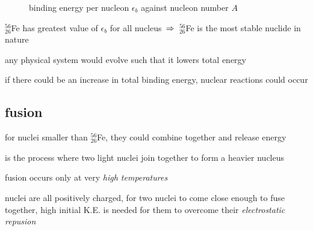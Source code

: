 \begin{figure*}[ht]
\centering
{}
  \label{binding-energy}
\caption{binding energy per nucleon $\epsilon_b$ against nucleon number $A$}
\end{figure*}


\cmt $^{56}_{26}$Fe has greatest value of $\epsilon_b$ for all nucleus $\, \Rightarrow \,$ $^{56}_{26}$Fe is the most stable nuclide in nature

\cmt any physical system would evolve such that it lowers total energy

if there could be an increase in total binding energy, nuclear reactions could occur


\subsection{fusion}

for nuclei smaller than $^{56}_{26}$Fe, they could combine together and release energy

\begin{ilight}
	 is the process where two light nuclei join together to form a heavier nucleus
\end{ilight}

\cmt fusion occurs only at very \emph{high temperatures}

nuclei are all positively charged, for two nuclei to come close enough to fuse together, high initial K.E. is needed for them to overcome their \emph{electrostatic repusion}

